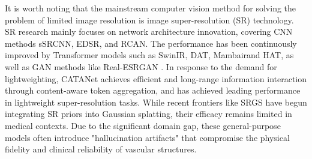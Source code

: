 \documentclass[runningheads]{llncs}
\begin{document}
It is worth noting that the mainstream computer vision method for solving the problem of limited image resolution is image super-resolution (SR) technology. SR research mainly focuses on network architecture innovation, covering CNN methods\cite{lecun2002gradient} sSRCNN\cite{dong2014learning}, EDSR\cite{lim2017enhanced}, and RCAN\cite{zhang2018image}. The performance has been continuously improved by Transformer models\cite{vaswani2017attention} such as SwinIR\cite{liang2021swinir}, DAT\cite{chen2023dat}, Mambair\cite{guo2025mambairv2}and HAT\cite{chen2023hat}, as well as GAN methods\cite{goodfellow2014generative} like Real-ESRGAN \cite{wang2021realesrgan}. In response to the demand for lightweighting, CATANet\cite{liu2025catanet} achieves efficient and long-range information interaction through content-aware token aggregation, and has achieved leading performance in lightweight super-resolution tasks.
While recent frontiers like SRGS \cite{feng2024srgs} have begun integrating SR priors into Gaussian splatting, their efficacy remains limited in medical contexts. 
Due to the significant domain gap, these general-purpose models often introduce "hallucination artifacts" that compromise the physical fidelity and clinical reliability of vascular structures.
\end{document}
